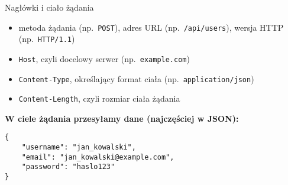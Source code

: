 \documentclass[10pt,compress,usenames,dvipsnames,aspectratio=169]{beamer}
\begin{document}
\begin{frame}[fragile]{Nagłówki i ciało żądania}
  \begin{itemize}
    \item metoda żądania (np.\ \texttt{POST}), adres URL (np.\ \texttt{/api/users}), wersja HTTP (np.\ \texttt{HTTP/1.1})
    \item \texttt{Host}, czyli docelowy serwer (np.\ \texttt{example.com})
    \item \texttt{Content-Type}, określający format ciała (np.\ \texttt{application/json})
    \item \texttt{Content-Length}, czyli rozmiar ciała żądania
  \end{itemize}

  \vspace{1ex}
  \textbf{W ciele żądania przesyłamy dane (najczęściej w JSON):}
  \begin{center}
    \begin{minipage}{0.6\textwidth}
      \begin{lstlisting}[style=dark, basicstyle=\ttfamily\scriptsize\color{fgcode}, numbers=none, xleftmargin=1em, xrightmargin=1em]
{
    "username": "jan_kowalski",
    "email": "jan_kowalski@example.com",
    "password": "haslo123"
}
      \end{lstlisting}
    \end{minipage}
  \end{center}
\end{frame}
\end{document}
